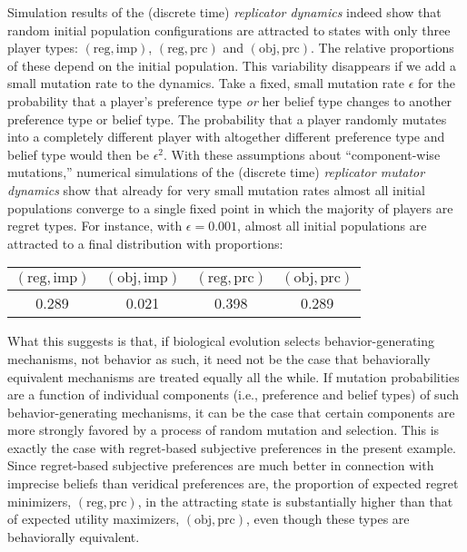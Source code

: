 \documentclass[fleqn,reqno,11pt]{article}
\begin{document}
Simulation results of the (discrete time) \emph{replicator dynamics}
\citep{TaylorJonker1978:Evolutionary-St} indeed show that random initial population
configurations are attracted to states with only three player types:
$(\text{reg}, \text{imp})$, $(\text{reg}, \text{prc})$ and $(\text{obj}, \text{prc})$. The
relative proportions of these depend on the initial population. This variability disappears if
we add a small mutation rate to the dynamics. Take a fixed, small mutation rate $\epsilon$ for
the probability that a player's preference type \emph{or} her belief type changes to another
preference type or belief type. The probability that a player randomly mutates into a
completely different player with altogether different preference type and belief type would
then be $\epsilon^2$. With these assumptions about ``component-wise mutations,'' numerical
simulations of the (discrete time) \emph{replicator mutator dynamics}
\citep{Nowak2006:Evolutionary-Dy} show that already for very small mutation rates almost all
initial populations converge to a single fixed point in which the majority of players are
regret types. For instance, with $\epsilon = 0.001$, almost all initial populations are
attracted to a final distribution with proportions:

\begin{center}
  \begin{tabular}{cccc}
    $(\text{reg}, \text{imp})$ & $(\text{obj}, \text{imp})$ & $(\text{reg},
      \text{prc})$ & $(\text{obj}, \text{prc})$ \\ \hline
    0.289  & 0.021 &   0.398 &    0.289 
  \end{tabular}
\end{center}

What this suggests is that, if biological evolution selects behavior-generating mechanisms, not
behavior as such, it need not be the case that behaviorally equivalent mechanisms are treated
equally all the while. If mutation probabilities are a function of individual components (i.e.,
preference and belief types) of such behavior-generating mechanisms, it can be the case that
certain components are more strongly favored by a process of random mutation and
selection. This is exactly the case with regret-based subjective preferences in the present
example. Since regret-based subjective preferences are much better in connection with imprecise
beliefs than veridical preferences are, the proportion of expected regret minimizers,
$(\text{reg}, \text{prc})$, in the attracting state is substantially higher than that of
expected utility maximizers, $(\text{obj}, \text{prc})$, even though these types are
behaviorally equivalent.
\end{document}

